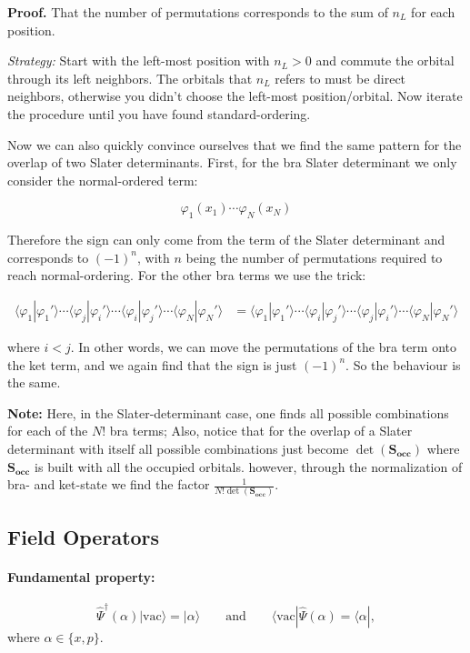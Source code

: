 \textbf{Proof.} That the number of permutations corresponds to the sum
of $n_L$ for each position.

\emph{Strategy:} Start with the left-most position with $n_L > 0$ and
commute the orbital through its left neighbors. The orbitals that
$n_L$ refers to must be direct neighbors, otherwise you didn't choose
the left-most position/orbital. Now iterate the procedure until you
have found standard-ordering.

Now we can also quickly convince ourselves that we find the same
pattern for the overlap of two Slater determinants. First, for the
bra Slater determinant we only consider the normal-ordered term:

\begin{equation*}
\varphi_1(x_1)\cdots\varphi_N(x_N)
\end{equation*}

Therefore the sign can only come from the term of the Slater
determinant and corresponds to $(-1)^n$, with $n$ being the number of
permutations required to reach normal-ordering. For the other bra
terms we use the trick:

\begin{align*}
\langle\varphi_1|\varphi_1'\rangle \cdots \langle\varphi_j|\varphi_i'\rangle \cdots \langle\varphi_i|\varphi_j'\rangle \cdots \langle\varphi_N|\varphi_N'\rangle
&= \langle\varphi_1|\varphi_1'\rangle \cdots \langle\varphi_i|\varphi_j'\rangle \cdots \langle\varphi_j|\varphi_i'\rangle \cdots \langle\varphi_N|\varphi_N'\rangle
\end{align*}

where $i<j$. In other words, we can move the permutations of the bra
term onto the ket term, and we again find that the sign is just
$(-1)^n$. So the behaviour is the same.

\textbf{Note:} Here, in the Slater-determinant case, one finds all possible combinations  
for each of the $N!$ bra terms; Also, notice that for the overlap of a Slater determinant 
with itself all possible combinations just become $\det(\mathbf{S_{occ}})$ where $\mathbf{S_{occ}}$ is built with all the 
occupied orbitals. however, through
the normalization of bra- and ket-state we find the factor $\tfrac{1}{N!\det(\mathbf{S_{occ}})}$.

\subsection*{Field Operators}

\paragraph{Fundamental property:}
\begin{equation}
\hat\varPsi^\dagger(\alpha)|\mathrm{vac}\rangle = |\alpha\rangle
\qquad\text{and}\qquad
\langle\mathrm{vac}|\hat\varPsi(\alpha) = \langle\alpha|,
\end{equation}
where $\alpha\in\{x,p\}$.

